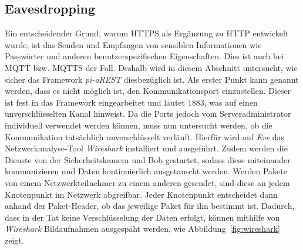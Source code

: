 \subsection{Eavesdropping}
Ein entscheidender Grund, warum HTTPS als Ergänzung zu HTTP entwickelt wurde,
ist das Senden und Empfangen von sensiblen Informationen wie Passwörter und
anderen benutzerspezifischen Eigenschaften. Dies ist auch bei MQTT bzw. MQTTS
der Fall. Deshalb wird in diesem Abschnitt untersucht, wie sicher das Framework
\textit{pi-aREST} diesbezüglich ist. Als erster Punkt kann genannt werden, dass
es nicht möglich ist, den Kommunikationsport einzustellen. Dieser ist fest in
das Framework eingearbeitet und lautet 1883, was auf einen unverschlüsselten
Kanal hinweist. Da die Ports jedoch vom Serveradministrator individuell
verwendet werden können, muss nun untersucht werden, ob die Kommunikation
tatsächlich unverschlüsselt verläuft. Hierfür wird auf \textit{Eve} das
Netzwerkanalyse-Tool \textit{Wireshark} installiert und ausgeführt. Zudem werden
die Dienste von der Sicherheitskamera und Bob gestartet, sodass diese
miteinander kommunizieren und Daten kontinuierlich ausgetauscht werden. Werden
Pakete von einem Netzwerkteilnehmer zu einem anderen gesendet, sind diese an
jedem Knotenpunkt im Netzwerk abgreifbar. Jeder Knotenpunkt entscheidet dann
anhand der Paket-Header, ob das jeweilige Paket für ihn bestimmt ist. Dadurch,
dass in der Tat keine Verschlüsselung der Daten erfolgt, können mithilfe von
\textit{Wireshark} Bildaufnahmen ausgespäht werden, wie
Abbildung~\ref{fig:wireshark} zeigt.
